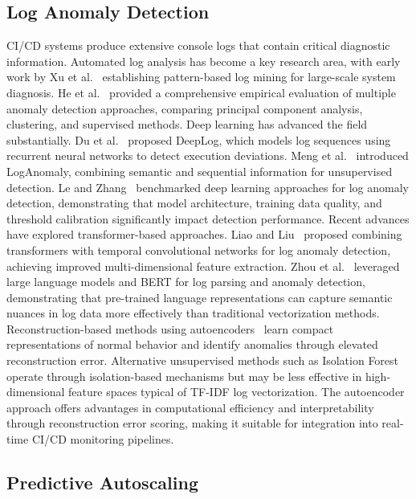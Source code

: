 \documentclass[sn-nature]{sn-jnl}
\theoremstyle{thmstyleone}
\theoremstyle{thmstyletwo}
\theoremstyle{thmstylethree}
\begin{document}
\subsection{Log Anomaly Detection}\label{subsec:loganomalyrelated}

CI/CD systems produce extensive console logs that contain critical diagnostic information.
Automated log analysis has become a key research area, with early work by Xu et al.~\cite{xu2009logmining} establishing pattern-based log mining for large-scale system diagnosis.
He et al.~\cite{he2016experience} provided a comprehensive empirical evaluation of multiple anomaly detection approaches, comparing principal component analysis, clustering, and supervised methods.
Deep learning has advanced the field substantially. Du et al.~\cite{du2017deeplog} proposed DeepLog, which models log sequences using recurrent neural networks to detect execution deviations.
Meng et al.~\cite{meng2019loganomaly} introduced LogAnomaly, combining semantic and sequential information for unsupervised detection.
Le and Zhang~\cite{le2022log} benchmarked deep learning approaches for log anomaly detection, demonstrating that model architecture, training data quality, and threshold calibration significantly impact detection performance.
Recent advances have explored transformer-based approaches. Liao and Liu~\cite{liao2025logtransformer} proposed combining transformers with temporal convolutional networks for log anomaly detection, achieving improved multi-dimensional feature extraction.
Zhou et al.~\cite{zhou2024logllm} leveraged large language models and BERT for log parsing and anomaly detection, demonstrating that pre-trained language representations can capture semantic nuances in log data more effectively than traditional vectorization methods.
Reconstruction-based methods using autoencoders~\cite{sakurada2014anomaly} learn compact representations of normal behavior and identify anomalies through elevated reconstruction error.
Alternative unsupervised methods such as Isolation Forest~\cite{liu2008isolation} operate through isolation-based mechanisms but may be less effective in high-dimensional feature spaces typical of TF-IDF log vectorization.
The autoencoder approach offers advantages in computational efficiency and interpretability through reconstruction error scoring, making it suitable for integration into real-time CI/CD monitoring pipelines.

\subsection{Predictive Autoscaling}\label{subsec:autoscaling}
\end{document}

